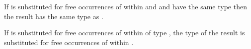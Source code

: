 If \first{\varexph} is substituted for free occurrences of \first{\varvarh} within \second{\varexph} and \first{\varexph} and \first{\varvarh} have the same type then the result has the same type as \second{\varexph}.



If \first{\vartyh} is substituted for free occurrences of \first{\tyvarh} within \first{\varexph} of type \second{\vartyh}, the type of the result is \first{\vartyh} substituted for free occurrences of \tyvarh within \second{\vartyh}.










